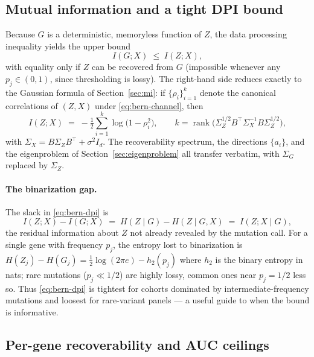 \documentclass{article}
\newcommand{\rank}{\operatorname{rank}}
\begin{document}
\subsection{Mutual information and a tight DPI bound}
\label{sec:bern-mi}

Because $G$ is a deterministic, memoryless function of $Z$, the data
processing inequality yields the upper bound
\begin{equation}
  I(G;X) \;\le\; I(Z;X),
  \label{eq:bern-dpi}
\end{equation}
with equality only if $Z$ can be recovered from $G$ (impossible whenever any
$p_j \in (0,1)$, since thresholding is lossy). The right-hand side reduces
exactly to the Gaussian formula of Section~\ref{sec:mi}: if $\{\rho_i\}_{i=1}^{k}$
denote the canonical correlations of $(Z,X)$ under \eqref{eq:bern-channel}, then
\begin{equation}
  I(Z;X) \;=\; -\tfrac{1}{2}\sum_{i=1}^{k} \log\bigl(1-\rho_i^2\bigr),
  \qquad
  k = \rank\bigl(\Sigma_Z^{1/2} B^\top \Sigma_X^{-1} B \Sigma_Z^{1/2}\bigr),
  \label{eq:bern-mi}
\end{equation}
with $\Sigma_X = B \Sigma_Z B^\top + \sigma^2 I_d$. The recoverability spectrum,
the directions $\{a_i\}$, and the eigenproblem of
Section~\ref{sec:eigenproblem} all transfer verbatim, with $\Sigma_G$ replaced
by $\Sigma_Z$.

\paragraph{The binarization gap.}
The slack in \eqref{eq:bern-dpi} is
\[
  I(Z;X) - I(G;X) \;=\; H(Z\mid G) - H(Z\mid G,X) \;=\; I(Z;X \mid G),
\]
the residual information about $Z$ not already revealed by the mutation call.
For a single gene with frequency $p_j$, the entropy lost to binarization is
$H(Z_j) - H(G_j) = \tfrac12 \log(2\pi e) - h_2(p_j)$ where $h_2$ is the binary
entropy in nats; rare mutations ($p_j \ll 1/2$) are highly lossy, common ones
near $p_j = 1/2$ less so. Thus \eqref{eq:bern-dpi} is tightest for cohorts
dominated by intermediate-frequency mutations and loosest for rare-variant
panels --- a useful guide to when the bound is informative.

\subsection{Per-gene recoverability and AUC ceilings}
\label{sec:bern-pergene}
\end{document}

